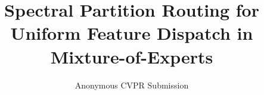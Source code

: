 \documentclass[10pt,twocolumn,letterpaper]{article}
\title{Spectral Partition Routing for Uniform Feature Dispatch in Mixture-of-Experts}
\author{Anonymous CVPR Submission}
\begin{document}
\maketitle
    





{
    \small
    
    
}
\end{document}
